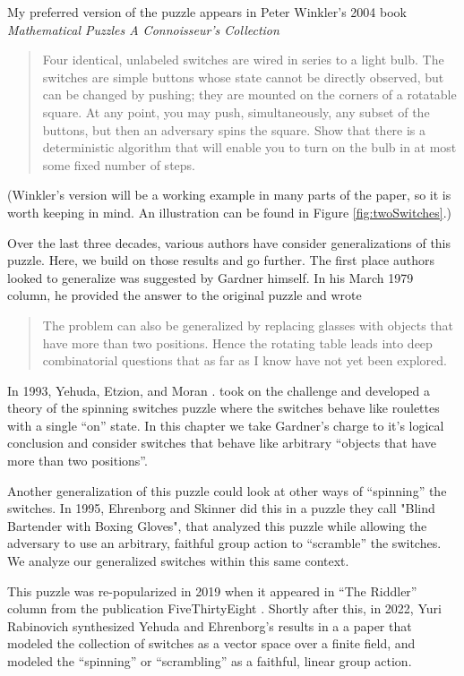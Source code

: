 My preferred version of the puzzle appears in Peter Winkler's 2004 book
\textit{Mathematical Puzzles A Connoisseur's Collection}
\begin{quote}
  Four identical, unlabeled switches are wired in series to a light bulb.
  The switches are simple buttons whose state cannot be directly observed,
  but can be changed by pushing; they are mounted on the corners of a
  rotatable square. At any point, you may push, simultaneously, any subset
  of the buttons, but then an adversary spins the square. Show that there
  is a deterministic algorithm that will enable you to turn on the bulb in
  at most some fixed number of steps. \cite{Winkler2004}
\end{quote}

(Winkler's version will be a working example in many parts of the paper, so it
is worth keeping in mind.
An illustration can be found in Figure \ref{fig:twoSwitches}.)

Over the last three decades, various authors have consider generalizations of
this puzzle. Here, we build on those results and go further.
The first place authors looked to generalize was suggested by Gardner himself.
In his March 1979 column, he provided the answer to the original puzzle and wrote
\begin{quote}
The problem can also be generalized by replacing glasses with objects that
have more than two positions. Hence the rotating table leads into deep
combinatorial questions that as far as I know have not yet been explored.
\cite{Gardner1979Solution}
\end{quote}

In 1993, Yehuda, Etzion, and Moran \cite{BarYehuda1993}. took on the challenge and developed a theory
of the spinning switches puzzle where the switches behave like roulettes
with a single ``on'' state. In this chapter we take Gardner's charge to
it's logical conclusion and consider switches that behave like arbitrary
``objects that have more than two positions''.

Another generalization of this puzzle could look at other ways of ``spinning''
the switches. In 1995, Ehrenborg and Skinner \cite{Ehrenborg1995} did this
in a puzzle they call "Blind Bartender with Boxing Gloves", that analyzed
this puzzle while allowing the adversary to use an arbitrary, faithful group action
to ``scramble'' the switches. We analyze our generalized switches within this
same context.

This puzzle was re-popularized in 2019 when it appeared in ``The Riddler''
column from the publication FiveThirtyEight \cite{FiveThirtyEight}.
Shortly after this, in 2022, Yuri Rabinovich synthesized Yehuda and Ehrenborg's
results in a a paper that modeled the collection of switches as a vector space
over a finite field, and modeled the ``spinning'' or ``scrambling'' as a
faithful, linear group action.

